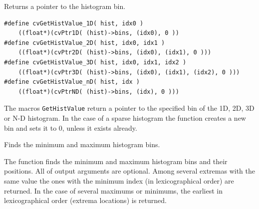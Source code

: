 \ifC %
Returns a pointer to the histogram bin.

\begin{lstlisting}
#define cvGetHistValue_1D( hist, idx0 ) 
    ((float*)(cvPtr1D( (hist)->bins, (idx0), 0 ))
#define cvGetHistValue_2D( hist, idx0, idx1 ) 
    ((float*)(cvPtr2D( (hist)->bins, (idx0), (idx1), 0 )))
#define cvGetHistValue_3D( hist, idx0, idx1, idx2 ) 
    ((float*)(cvPtr3D( (hist)->bins, (idx0), (idx1), (idx2), 0 )))
#define cvGetHistValue_nD( hist, idx ) 
    ((float*)(cvPtrND( (hist)->bins, (idx), 0 )))
\end{lstlisting}

\begin{description}
\end{description}

The macros \texttt{GetHistValue} return a pointer to the specified bin of the 1D, 2D, 3D or N-D histogram. In the case of a sparse histogram the function creates a new bin and sets it to 0, unless it exists already.
\fi %

Finds the minimum and maximum histogram bins.


\begin{description}
\ifC
{}
\else
{}
\fi

\end{description}

The function finds the minimum and
maximum histogram bins and their positions. All of output arguments are
optional. Among several extremas with the same value the ones with the
minimum index (in lexicographical order) are returned. In the case of several maximums
or minimums, the earliest in lexicographical order (extrema locations)
is returned.

